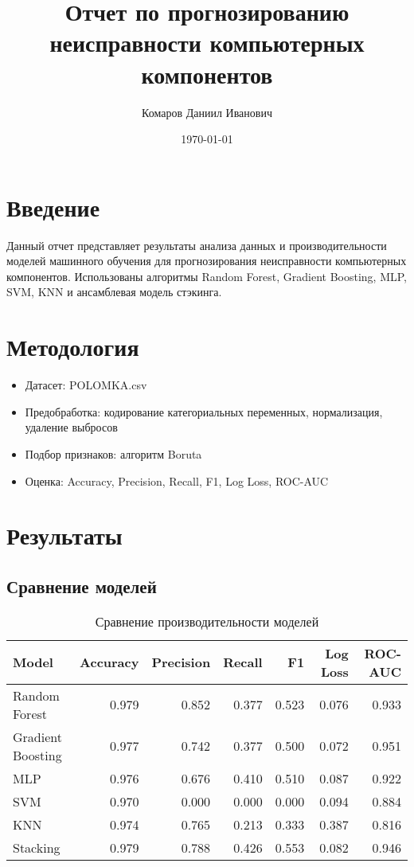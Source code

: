 \documentclass[a4paper,12pt]{article}
\begin{document}
\title{Отчет по прогнозированию неисправности компьютерных компонентов}
\author{Комаров Даниил Иванович}
\date{\today}
\maketitle

\section{Введение}
Данный отчет представляет результаты анализа данных и производительности моделей машинного обучения для прогнозирования неисправности компьютерных компонентов. Использованы алгоритмы Random Forest, Gradient Boosting, MLP, SVM, KNN и ансамблевая модель стэкинга.

\section{Методология}
\begin{itemize}
    \item Датасет: POLOMKA.csv
    \item Предобработка: кодирование категориальных переменных, нормализация, удаление выбросов
    \item Подбор признаков: алгоритм Boruta
    \item Оценка: Accuracy, Precision, Recall, F1, Log Loss, ROC-AUC
\end{itemize}

\section{Результаты}
\subsection{Сравнение моделей}
\begin{table}
\caption{Сравнение производительности моделей}
\label{tab:model_comparison}
\begin{tabular}{lrrrrrr}
\toprule
Model & Accuracy & Precision & Recall & F1 & Log Loss & ROC-AUC \\
\midrule
Random Forest & 0.979 & 0.852 & 0.377 & 0.523 & 0.076 & 0.933 \\
Gradient Boosting & 0.977 & 0.742 & 0.377 & 0.500 & 0.072 & 0.951 \\
MLP & 0.976 & 0.676 & 0.410 & 0.510 & 0.087 & 0.922 \\
SVM & 0.970 & 0.000 & 0.000 & 0.000 & 0.094 & 0.884 \\
KNN & 0.974 & 0.765 & 0.213 & 0.333 & 0.387 & 0.816 \\
Stacking & 0.979 & 0.788 & 0.426 & 0.553 & 0.082 & 0.946 \\
\bottomrule
\end{tabular}
\end{table}
\end{document}
